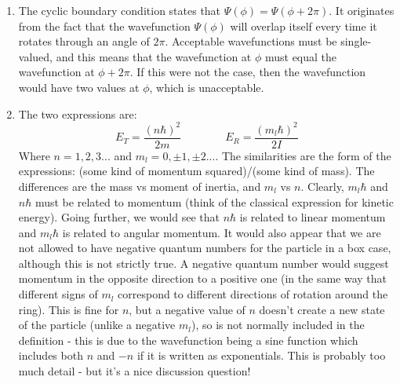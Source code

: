 \documentclass{memoir}[11pt,oneside,a4paper,openany]
\begin{document}
\begin{enumerate}
	\item The cyclic boundary condition states that $\Psi(\phi) = \Psi(\phi+2\pi)$. It originates from the fact that the wavefunction $\Psi(\phi)$ will overlap itself every time it rotates through an angle of $2\pi$. Acceptable wavefunctions must be single-valued, and this means that the wavefunction at $\phi$ must equal the wavefunction at $\phi+2\pi$. If this were not the case, then the wavefunction would have two values at $\phi$, which is unacceptable. 
	\item The two expressions are:
		\begin{equation}
			E_T = \frac{(n\hbar)^2}{2m} \qquad \qquad E_R = \frac{(m_l\hbar)^2}{2I}
		\end{equation}
		Where $n=1,2,3...$ and $m_l=0,\pm1,\pm2...$. The similarities are the form of the expressions: (some kind of momentum squared)/(some kind of mass). The differences are the mass vs moment of inertia, and $m_l$ vs $n$. Clearly, $m_l\hbar$ and $n\hbar$ must be related to momentum (think of the classical expression for kinetic energy). Going further, we would see that $n\hbar$ is related to linear momentum and $m_l\hbar$ is related to angular momentum. It would also appear that we are not allowed to have negative quantum numbers for the particle in a box case, although this is not strictly true. A negative quantum number would suggest momentum in the opposite direction to a positive one (in the same way that different signs of $m_l$ correspond to different directions of rotation around the ring). This is fine for $n$, but a negative value of $n$ doesn't create a new state of the particle (unlike a negative $m_l$), so is not normally included in the definition - this is due to the wavefunction being a sine function which includes both $n$ and $-n$ if it is written as exponentials. This is probably too much detail - but it's a nice discussion question!


\end{enumerate}
\end{document}
